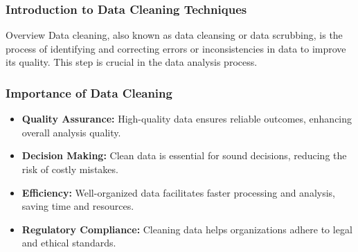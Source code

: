 \documentclass[aspectratio=169]{beamer}
\begin{document}
\frame{\titlepage}

\begin{frame}[fragile]
    \frametitle{Introduction to Data Cleaning Techniques}
    \begin{block}{Overview}
        Data cleaning, also known as data cleansing or data scrubbing, is the process of identifying and correcting errors or inconsistencies in data to improve its quality. This step is crucial in the data analysis process.
    \end{block}
\end{frame}

\begin{frame}[fragile]
    \frametitle{Importance of Data Cleaning}
    \begin{itemize}
        \item \textbf{Quality Assurance:} High-quality data ensures reliable outcomes, enhancing overall analysis quality.
        \item \textbf{Decision Making:} Clean data is essential for sound decisions, reducing the risk of costly mistakes.
        \item \textbf{Efficiency:} Well-organized data facilitates faster processing and analysis, saving time and resources.
        \item \textbf{Regulatory Compliance:} Cleaning data helps organizations adhere to legal and ethical standards.
    \end{itemize}
\end{frame}
\end{document}
